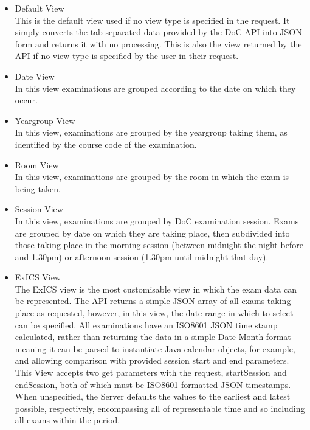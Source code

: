 \begin{itemize}

\item Default View\\
	This is the default view used if no view type is specified in the request.  It simply converts the tab separated data provided by the DoC API into JSON form and returns it with no processing.  This is also the view returned by the API if no view type is specified by the user in their request.

\item Date View\\
	In this view examinations are grouped according to the date on which they occur.

\item Yeargroup View\\
	In this view, examinations are grouped by the yeargroup taking them, as identified by the course code of the examination.

\item Room View\\
	In this view, examinations are grouped by the room in which the exam is being taken.

\item Session View\\
	In this view, examinations are grouped by DoC examination session.  Exams are grouped by date on which they are taking place, then subdivided into those taking place in the morning session (between midnight the night before and 1.30pm) or afternoon session (1.30pm until midnight that day).

\item ExICS View\\
	The ExICS view is the most customisable view in which the exam data can be represented.  The API returns a simple JSON array of all exams taking place as requested, however, in this view, the date range in which to select can be specified.  All examinations have an ISO8601 \cite{iso8601} JSON time stamp calculated, rather than returning the data in a simple Date-Month format meaning it can be parsed to instantiate Java calendar objects, for example, and allowing comparison with provided session start and end parameters.\\
	This View accepts two get parameters with the request, startSession and endSession, both of which must be ISO8601 formatted JSON timestamps.  When unspecified, the Server defaults the values to the earliest and latest possible, respectively, encompassing all of representable time and so including all exams within the period.

\end{itemize}

